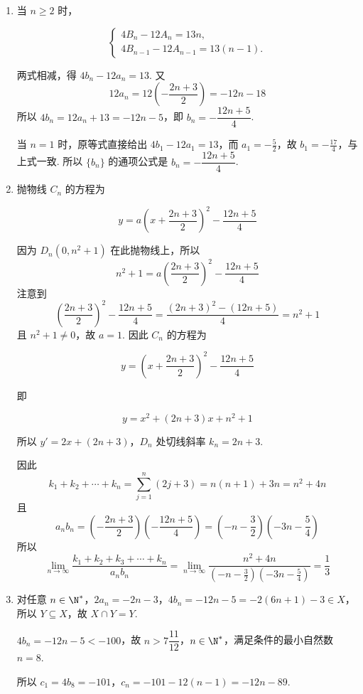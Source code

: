 \documentclass[UTF8,a4paper,oneside,11pt]{ctexbook}
\begin{document}
\begin{solution}
\begin{enumerate}
\item 当 \(n\geqslant2\) 时，

\[
\begin{cases}
4B_n-12A_n=13n,\\
4B_{n-1}-12A_{n-1}=13(n-1).
\end{cases}
\]

两式相减，得 \(4b_n-12a_n=13\). 又
\[
12a_n=12\left(-\frac{2n+3}{2}\right)=-12n-18
\]
所以 \(4b_n=12a_n+13=-12n-5\)，即 \(b_n=-\dfrac{12n+5}{4}\).

当 \(n=1\) 时，原等式直接给出 \(4b_1-12a_1=13\)，而 \(a_1=-\frac52\)，故 \(b_1=-\frac{17}{4}\)，与上式一致. 所以 \(\{b_n\}\) 的通项公式是 \(b_n=-\dfrac{12n+5}{4}\).

\item 抛物线 \(C_n\) 的方程为

\[
y=a\left(x+\frac{2n+3}{2}\right)^2-\frac{12n+5}{4}
\]

因为 \(D_n(0,n^2+1)\) 在此抛物线上，所以
\[
n^2+1=a\left(\frac{2n+3}{2}\right)^2-\frac{12n+5}{4}
\]
注意到
\[
\left(\frac{2n+3}{2}\right)^2-\frac{12n+5}{4}=\frac{(2n+3)^2-(12n+5)}4=n^2+1
\]
且 \(n^2+1\ne0\)，故 \(a=1\). 因此 \(C_n\) 的方程为

\[
y=\left(x+\frac{2n+3}{2}\right)^2-\frac{12n+5}{4}
\]

即

\[
y=x^2+(2n+3)x+n^2+1
\]

所以 \(y'=2x+(2n+3)\)，\(D_n\) 处切线斜率 \(k_n=2n+3\).

因此
\[
k_1+k_2+\cdots+k_n=\sum_{j=1}^{n}(2j+3)=n(n+1)+3n=n^2+4n
\]
且
\[
a_nb_n=\left(-\frac{2n+3}{2}\right)\left(-\frac{12n+5}{4}\right)=\left(-n-\frac32\right)\left(-3n-\frac54\right)
\]
所以
\[
\lim_{n\to\infty}\frac{k_1+k_2+k_3+\cdots+k_n}{a_nb_n}=\lim_{n\to\infty}\frac{n^2+4n}{\left(-n-\frac{3}{2}\right)\left(-3n-\frac{5}{4}\right)}=\frac{1}{3}
\]

\item 对任意 \(n\in\N^{*}\)，\(2a_n=-2n-3\)，\(4b_n=-12n-5=-2(6n+1)-3\in X\)，所以 \(Y\subseteq X\)，故 \(X\cap Y=Y\).

\(4b_n=-12n-5<-100\)，故 \(n>7\dfrac{11}{12}\)，\(n\in\N^{*}\)，满足条件的最小自然数 \(n=8\).

所以 \(c_1=4b_8=-101\)，\(c_n=-101-12(n-1)=-12n-89\).
\end{enumerate}
\end{solution}

\end{document}

